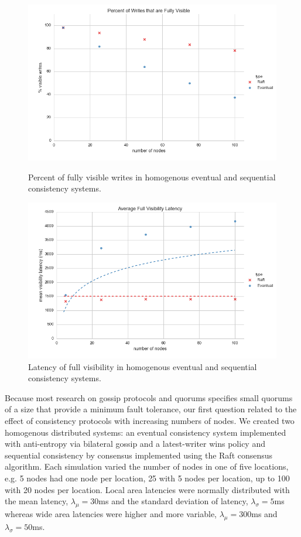 \documentclass{article}
\begin{document}
\begin{figure}
    \centering
      \includegraphics[width=\linewidth]{figures/scaling/visible_writes}
      \caption{Percent of fully visible writes in homogenous eventual and sequential consistency systems.}
      \label{fig:scaling_visible_writes}
    \endminipage\hfill
      \includegraphics[width=\linewidth]{figures/scaling/visibility_latency}
      \caption{Latency of full visibility in homogenous eventual and sequential consistency systems.}
      \label{fig:scaling_visibility_latency}
    \endminipage
\end{figure}

Because most research on gossip protocols and quorums specifies small quorums of a size that provide a minimum fault tolerance, our first question related to the effect of consistency protocols with increasing numbers of nodes. We created two homogenous distributed systems: an eventual consistency system implemented with anti-entropy via bilateral gossip and a latest-writer wins policy and sequential consistency by consensus implemented using the Raft consensus algorithm. Each simulation varied the number of nodes in one of five locations, e.g. 5 nodes had one node per location, 25 with 5 nodes per location, up to 100 with 20 nodes per location. Local area latencies were normally distributed with the mean latency, $\lambda_{\mu}=30$ms and the standard deviation of latency, $\lambda_{\sigma}=5$ms whereas wide area latencies were higher and more variable, $\lambda_{\mu}=300$ms and $\lambda_{\sigma}=50$ms.
\end{document}
